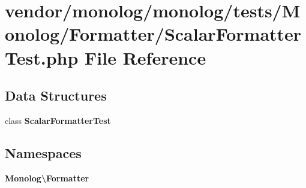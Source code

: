 \section{vendor/monolog/monolog/tests/\+Monolog/\+Formatter/\+Scalar\+Formatter\+Test.php File Reference}
\label{_scalar_formatter_test_8php}
\subsection*{Data Structures}
\begin{DoxyCompactItemize}
\item 
class {\bf Scalar\+Formatter\+Test}
\end{DoxyCompactItemize}
\subsection*{Namespaces}
\begin{DoxyCompactItemize}
\item 
 {\bf Monolog\textbackslash{}\+Formatter}
\end{DoxyCompactItemize}
